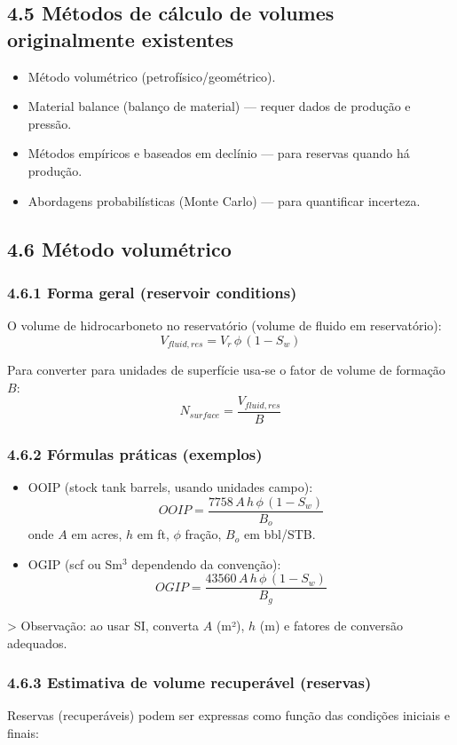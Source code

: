 \documentclass[11pt,a4paper]{article}
\begin{document}
\subsection{4.5 Métodos de cálculo de volumes originalmente existentes}
\begin{itemize}
\item Método volumétrico (petrofísico/geométrico).
\item Material balance (balanço de material) — requer dados de produção e pressão.
\item Métodos empíricos e baseados em declínio — para reservas quando há produção.
\item Abordagens probabilísticas (Monte Carlo) — para quantificar incerteza.
\end{itemize}

\subsection{4.6 Método volumétrico}
\subsubsection{4.6.1 Forma geral (reservoir conditions)}
O volume de hidrocarboneto no reservatório (volume de fluido em reservatório):
$$
V_{fluid,res} = V_r\,\phi\,(1-S_w)
$$

Para converter para unidades de superfície usa‑se o fator de volume de formação $B$:
$$
N_{surface} = \frac{V_{fluid,res}}{B}
$$

\subsubsection{4.6.2 Fórmulas práticas (exemplos)}
\begin{itemize}
\item OOIP (stock tank barrels, usando unidades campo):
$$
OOIP = \frac{7758\,A\,h\,\phi\,(1-S_w)}{B_o}
$$
onde $A$ em acres, $h$ em ft, $\phi$ fração, $B_o$ em bbl/STB.
\end{itemize}

\begin{itemize}
\item OGIP (scf ou Sm$^3$ dependendo da convenção):
$$
OGIP = \frac{43560\,A\,h\,\phi\,(1-S_w)}{B_g}
$$
\end{itemize}

> Observação: ao usar SI, converta $A$ (m²), $h$ (m) e fatores de conversão adequados.

\subsubsection{4.6.3 Estimativa de volume recuperável (reservas)}
Reservas (recuperáveis) podem ser expressas como função das condições iniciais e finais:
\end{document}
